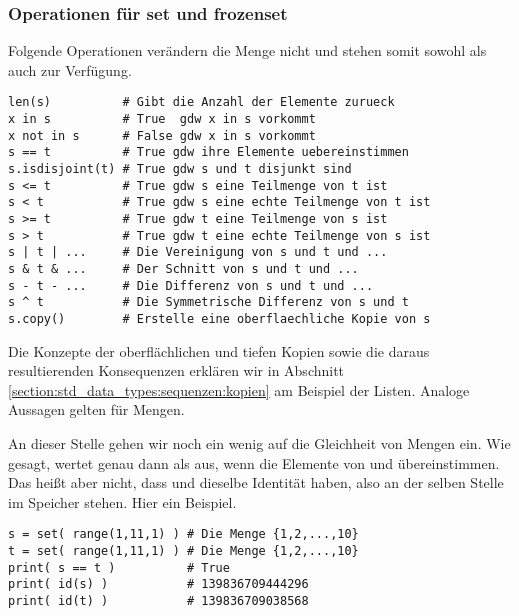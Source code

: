\subsubsection{Operationen für set und frozenset}
\label{section:std_data_types:mengen:operationen_fuer_set_und_frozenset}
Folgende Operationen verändern die Menge nicht und stehen somit sowohl  als auch  zur Verfügung.
\begin{lstlisting}
len(s)          # Gibt die Anzahl der Elemente zurueck
x in s          # True  gdw x in s vorkommt
x not in s      # False gdw x in s vorkommt
s == t          # True gdw ihre Elemente uebereinstimmen
s.isdisjoint(t) # True gdw s und t disjunkt sind
s <= t          # True gdw s eine Teilmenge von t ist
s < t           # True gdw s eine echte Teilmenge von t ist
s >= t          # True gdw t eine Teilmenge von s ist
s > t           # True gdw t eine echte Teilmenge von s ist
s | t | ...     # Die Vereinigung von s und t und ...
s & t & ...     # Der Schnitt von s und t und ...
s - t - ...     # Die Differenz von s und t und ...
s ^ t           # Die Symmetrische Differenz von s und t
s.copy()        # Erstelle eine oberflaechliche Kopie von s
\end{lstlisting}
Die Konzepte der oberflächlichen und tiefen Kopien sowie die daraus resultierenden Konsequenzen erklären wir in Abschnitt \ref{section:std_data_types:sequenzen:kopien} am Beispiel der Listen.
Analoge Aussagen gelten für Mengen.

An dieser Stelle gehen wir noch ein wenig auf die Gleichheit von Mengen ein.
Wie gesagt, wertet  genau dann als  aus, wenn die Elemente von  und  über\-ein\-stim\-men.
Das heißt aber nicht, dass  und  dieselbe Identität haben, also an der selben Stelle im Speicher stehen.
Hier ein Beispiel.
\begin{lstlisting}
s = set( range(1,11,1) ) # Die Menge {1,2,...,10}
t = set( range(1,11,1) ) # Die Menge {1,2,...,10}
print( s == t )          # True
print( id(s) )           # 139836709444296
print( id(t) )           # 139836709038568
\end{lstlisting}


